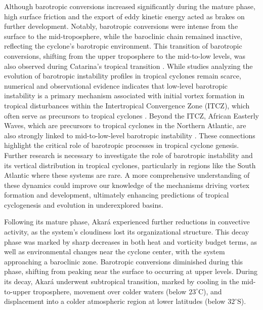 \documentclass[pdflatex,sn-chicago]{sn-jnl}%
\theoremstyle{plain}
\theoremstyle{definition}
\theoremstyle{remark}
\theoremstyle{definition}
\begin{document}
Although barotropic conversions increased significantly during the mature phase, high surface friction and the export of eddy kinetic energy acted as brakes on further development. Notably, barotropic conversions were intense from the surface to the mid-troposphere, while the baroclinic chain remained inactive, reflecting the cyclone's barotropic environment. This transition of barotropic conversions, shifting from the upper troposphere to the mid-to-low levels, was also observed during Catarina's tropical transition \citep{veiga2008analysis}. While studies analyzing the evolution of barotropic instability profiles in tropical cyclones remain scarce, numerical and observational evidence indicates that low-level barotropic instability is a primary mechanism associated with initial vortex formation in tropical disturbances within the Intertropical Convergence Zone (ITCZ), which often serve as precursors to tropical cyclones \citep{ferreira1997barotropic,yokota2012tropical,yokota2015tropical,bembenek2021influence}. Beyond the ITCZ, African Easterly Waves, which are precursors to tropical cyclones in the Northern Atlantic, are also strongly linked to mid-to-low-level barotropic instability \citep{burpee1972origin,rennick1976generation,molinari1997potential,reed1977structure,wu2012african}. These connections highlight the critical role of barotropic processes in tropical cyclone genesis. Further research is necessary to investigate the role of barotropic instability and its vertical distribution in tropical cyclones, particularly in regions like the South Atlantic where these systems are rare. A more comprehensive understanding of these dynamics could improve our knowledge of the mechanisms driving vortex formation and development, ultimately enhancing predictions of tropical cyclogenesis and evolution in underexplored basins.

Following its mature phase, Akará experienced further reductions in convective activity, as the system's cloudiness lost its organizational structure. This decay phase was marked by sharp decreases in both heat and vorticity budget terms, as well as environmental changes near the cyclone center, with the system approaching a baroclinic zone. Barotropic conversions diminished during this phase, shifting from peaking near the surface to occurring at upper levels. During its decay, Akará underwent subtropical transition, marked by cooling in the mid-to-upper troposphere, movement over colder waters (below $23^{\circ}\text{C}$), and displacement into a colder atmospheric region at lower latitudes (below $32^{\circ}\text{S}$).
\end{document}

